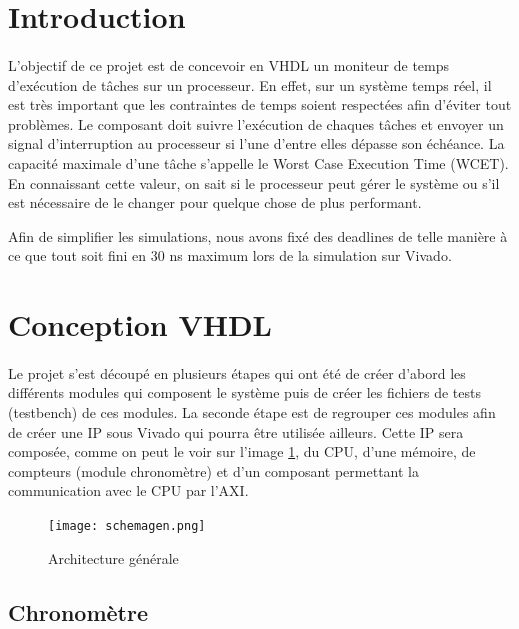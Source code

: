 \documentclass[a4paper,12pt]{report}
\begin{document}
	\newpage\renewcommand{\contentsname}{Sommaire}
	\tableofcontents

	\newpage
	\section{Introduction}
		\paragraph*{}
		L'objectif de ce projet est de concevoir en VHDL un moniteur de temps d'exécution de tâches sur un processeur. En effet, sur un système temps réel, il est très important que les contraintes de temps soient respectées afin d'éviter tout problèmes. Le composant doit suivre l'exécution de chaques tâches et envoyer un signal d'interruption au processeur si l'une d'entre elles dépasse son échéance. La capacité maximale d'une tâche s'appelle le Worst Case Execution Time (WCET). En connaissant cette valeur, on sait si le processeur peut gérer le système ou s'il est nécessaire de le changer pour quelque chose de plus performant.
		
		Afin de simplifier les simulations, nous avons fixé des deadlines de telle manière à ce que tout soit fini en 30 ns maximum lors de la simulation sur Vivado.
		
	\section{Conception VHDL}
		\paragraph*{}
		Le projet s'est découpé en plusieurs étapes qui ont été de créer d'abord les différents modules qui composent le système puis de créer les fichiers de tests (testbench) de ces modules.
		La seconde étape est de regrouper ces modules afin de créer une IP sous Vivado qui pourra être utilisée ailleurs.
		Cette IP sera composée, comme on peut le voir sur l'image \ref{archi}, du CPU, d'une mémoire, de compteurs (module chronomètre) et d'un composant permettant la communication avec le CPU par l'AXI.
		
		\begin{figure}[H]
			\centering
				\texttt{[image: schemagen.png]}
				\caption{Architecture générale}
			\label{archi}
		\end{figure}
		
		\subsection{Chronomètre}
\end{document}
